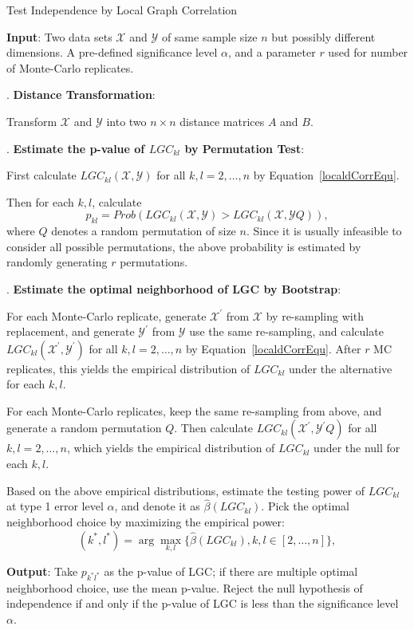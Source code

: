 \documentclass[11pt]{article}
\begin{document}
\begin{algorithm}
\label{algSRC}
\caption{Test Independence by Local Graph Correlation} 
\begin{algorithmic} 
\State \textbf{Input}: Two data sets $\mathcal{X}$ and $\mathcal{Y}$ of same sample size $n$ but possibly different dimensions. A pre-defined significance level $\alpha$, and a parameter $r$ used for number of Monte-Carlo replicates.

. \textbf{Distance Transformation}:

Transform $\mathcal{X}$ and $\mathcal{Y}$ into two $n \times n$ distance matrices $A$ and $B$. 

. \textbf{Estimate the p-value of $LGC_{kl}$ by Permutation Test}: 

First calculate $LGC_{kl}(\mathcal{X}, \mathcal{Y})$ for all $k,l=2,\ldots,n$ by Equation~\ref{localdCorrEqu}. 

Then for each $k,l$, calculate
\begin{equation}
\label{pvalue}
p_{kl}=Prob(LGC_{kl}(\mathcal{X}, \mathcal{Y})>LGC_{kl}(\mathcal{X}, \mathcal{Y}Q)),
\end{equation}
where $Q$ denotes a random permutation of size $n$. Since it is usually infeasible to consider all possible permutations, the above probability is estimated by randomly generating $r$ permutations.

. \textbf{Estimate the optimal neighborhood of LGC by Bootstrap}:

For each Monte-Carlo replicate, generate $\mathcal{X}^{'}$ from $\mathcal{X}$ by re-sampling with replacement, and generate $\mathcal{Y}^{'}$ from $\mathcal{Y}$ use the same re-sampling, and calculate $LGC_{kl}(\mathcal{X}^{'}, \mathcal{Y}^{'})$ for all $k,l=2,\ldots,n$ by Equation~\ref{localdCorrEqu}. After $r$ MC replicates, this yields the empirical distribution of $LGC_{kl}$ under the alternative for each $k,l$.

For each Monte-Carlo replicates, keep the same re-sampling from above, and generate a random permutation $Q$. Then calculate $LGC_{kl}(\mathcal{X}^{'}, \mathcal{Y}^{'}Q)$ for all $k,l=2,\ldots,n$, which yields the empirical distribution of $LGC_{kl}$ under the null for each $k,l$.

Based on the above empirical distributions, estimate the testing power of $LGC_{kl}$ at type 1 error level $\alpha$, and denote it as $\hat{\beta}(LGC_{kl})$. Pick the optimal neighborhood choice by maximizing the empirical power:
\begin{equation}
\label{power}
(k^{*},l^{*})=\arg\max_{k,l}\{\hat{\beta}(LGC_{kl}), k,l\in [2,\ldots,n]\},
\end{equation}

\State \textbf{Output}: Take $p_{k^{*}l^{*}}$ as the p-value of LGC; if there are multiple optimal neighborhood choice, use the mean p-value. Reject the null hypothesis of independence if and only if the p-value of LGC is less than the significance level $\alpha$.
\end{algorithmic} 
\end{algorithm} 
\end{document}
